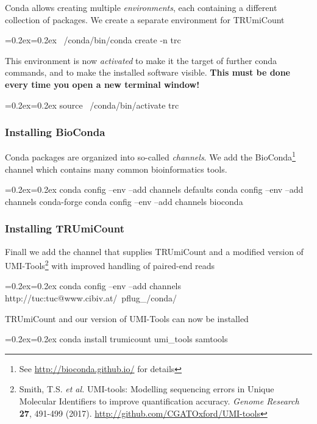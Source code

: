 \documentclass{scrartcl}
\newenvironment{shellcode}%
   {\bgroup\topsep=0.2ex\partopsep=0.2ex\shaded\verbatim}%
   {\endverbatim\endshaded\egroup}
\begin{document}
Conda allows creating multiple \emph{environments}, each containing a different collection of packages. We create a separate environment for TRUmiCount

\begin{shellcode}
~/conda/bin/conda create -n trc
\end{shellcode}

This environment is now \emph{activated} to make it the target of further conda commands, and to make the installed software visible. \textbf{This must be done every time you open a new terminal window!}

\begin{shellcode}
source ~/conda/bin/activate trc
\end{shellcode}
\subsubsection*{Installing BioConda}

Conda packages are organized into so-called \emph{channels}. We add the BioConda\footnote{See \url{http://bioconda.github.io/} for details} channel which contains many common bioinformatics tools.

\begin{shellcode}
conda config --env --add channels defaults
conda config --env --add channels conda-forge
conda config --env --add channels bioconda
\end{shellcode}

\subsubsection*{Installing TRUmiCount}

Finall we add the channel that supplies TRUmiCount and a modified version of UMI-Tools\footnote{Smith, T.S. \textit{et al.} UMI-tools: Modelling sequencing errors in Unique Molecular Identifiers to improve quantification accuracy. \textit{Genome Research} \textbf{27}, 491-499 (2017). \url{http://github.com/CGATOxford/UMI-tools}} with improved handling of paired-end reads

\begin{shellcode}
conda config --env --add channels http://tuc:tuc@www.cibiv.at/~pflug_/conda/
\end{shellcode}

TRUmiCount and our version of UMI-Tools can now be installed

\begin{shellcode}
conda install trumicount umi_tools samtools
\end{shellcode}
\end{document}
